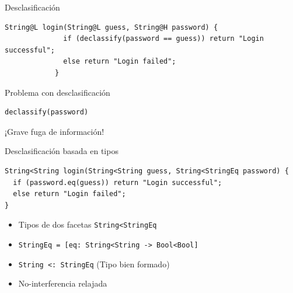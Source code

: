 \documentclass[aspectratio=169,10pt]{beamer}
\begin{document}
\begin{frame}[fragile]{Desclasificación}
	\begin{center}
\begin{lstlisting}[basicstyle=\fontsize{9}{9}\ttfamily]
            String@L login(String@L guess, String@H password) {
              if (declassify(password == guess)) return "Login successful";
              else return "Login failed";
            }
\end{lstlisting}
	\end{center}
\end{frame}

\begin{frame}[fragile]{Problema con desclasificación}
	\begin{center}
\begin{lstlisting}[basicstyle=\fontsize{9}{9}\ttfamily]
                                    declassify(password)
\end{lstlisting} \pause
		\vspace{3cm}
		\alert{¡Grave fuga de información!}
	\end{center}
\end{frame}

\begin{frame}[fragile]{Desclasificación basada en tipos}
\begin{lstlisting}[basicstyle=\fontsize{9}{9}\ttfamily]
String<String login(String<String guess, String<StringEq password) {
  if (password.eq(guess)) return "Login successful";
  else return "Login failed";
}
\end{lstlisting}

\begin{itemize}
	\item Tipos de dos facetas \texttt{String<StringEq} \pause
	\item \texttt{StringEq = [eq: String<String -> Bool<Bool]} \pause
	\item \texttt{String <: StringEq} (Tipo bien formado) \pause
	\item No-interferencia relajada 
\end{itemize}

\end{frame}
\end{document}
